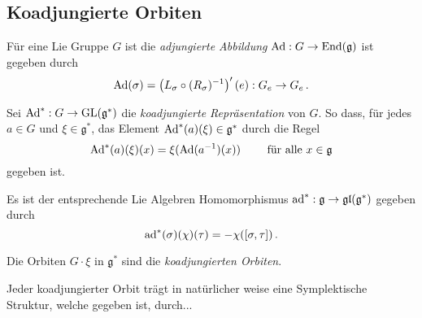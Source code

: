 \subsection{Koadjungierte Orbiten}
\begin{comment}
\begin{itemize}
\item 
siehe \cite{bryant} auf Seite 86ff
\begin{itemize}
\item 
vor allem \cite[Proposition 3]{bryant} auf Seite 86.
\end{itemize}
\item 
siehe \cite{warnerLie} auf Seite 112ff
\item
siehe \cite{ki99}
für die Symplektische Struktur
\end{itemize}
\end{comment}
\begin{defn}
Für eine Lie Gruppe $G$ ist die \emph{adjungierte Abbildung} 
$\operatorname{Ad}: G \to \operatorname{End}(\mathfrak g)$ 
ist gegeben durch
\[
\operatorname{Ad}(\sigma)=\left(L_\sigma\circ (R_\sigma)^{-1}\right)'(e):G_e\to G_e \,.
\]
\end{defn}
\begin{comment}
\begin{defn} \ccite[Seite 16]{bryant}
 ...die \emph{adjungierte Repräsentation von $G$}...
\end{defn}
\end{comment}
\begin{defn}
Sei $\operatorname{Ad}^*:G\to\operatorname{GL}(\mathfrak g^*)$ die \emph{koadjungierte Repräsentation}
von $G$.
So dass, für jedes $a\in G$ und $\xi \in \mathfrak g^*$, das Element
$\operatorname{Ad}^*(a)(\xi)\in \mathfrak g^*$ durch die Regel
\[
\operatorname{Ad}^*(a)(\xi)(x)=\xi(\operatorname{Ad}(a^{-1})(x)) \qquad \text{ für alle } x\in \mathfrak g
\]
gegeben ist.
\end{defn}
\begin{bem} 
Es ist der entsprechende Lie Algebren Homomorphismus $\operatorname{ad}^*:\mathfrak g \to
\mathfrak{gl(g^*)}$ gegeben durch
\[
\operatorname{ad}^*(\sigma)(\chi)(\tau)=-\chi([\sigma,\tau]) \,.
\]
\end{bem}
\begin{defn} 
Die Orbiten $G\cdot \xi$ in $\mathfrak g^*$ sind die
\emph{koadjungierten Orbiten}.
\end{defn}
Jeder koadjungierter Orbit trägt in natürlicher weise eine Symplektische
Struktur, welche gegeben ist, durch...
\begin{comment}
\begin{ex} \ccite[p. 96]{bryant}
\textbf{10.} For any Lie group $G$ and any $\xi\in\mathfrak g^∗$, show that the
symplectic structures $\Omega_\xi$ and $\Omega_{\sigma\cdot\xi}$ on
$G\cdot\xi$ are the same for any $\sigma\in G$.
\end{ex}
\end{comment}

